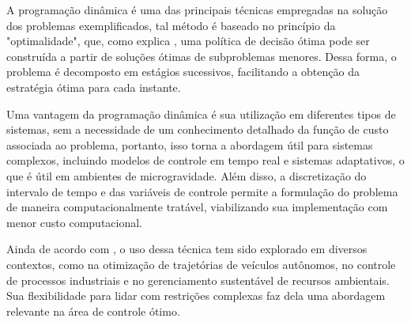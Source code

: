 A programação dinâmica é uma das principais técnicas empregadas na solução dos problemas exemplificados, tal método é baseado no princípio da "optimalidade", que, como explica \citep{dinizBassanezi}, uma política de decisão ótima pode ser construída a partir de soluções ótimas de subproblemas menores. Dessa forma, o problema é decomposto em estágios sucessivos, facilitando a obtenção da estratégia ótima para cada instante. 

Uma vantagem da programação dinâmica é sua utilização em diferentes tipos de sistemas, sem a necessidade de um conhecimento detalhado da função de custo associada ao problema, portanto, isso torna a abordagem útil para sistemas complexos, incluindo modelos de controle em tempo real e sistemas adaptativos, o que é útil em ambientes de microgravidade. Além disso, a discretização do intervalo de tempo e das variáveis de controle permite a formulação do problema de maneira computacionalmente tratável, viabilizando sua implementação com menor custo computacional.

Ainda de acordo com \citep{dinizBassanezi}, o uso dessa técnica tem sido explorado em diversos contextos, como na otimização de trajetórias de veículos autônomos, no controle de processos industriais e no gerenciamento sustentável de recursos ambientais. Sua flexibilidade para lidar com restrições complexas faz dela uma abordagem relevante na área de controle ótimo. 




